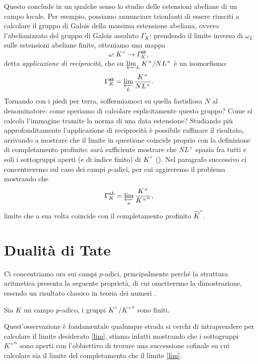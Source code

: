 Questo conclude in un qualche senso lo studio delle estensioni abeliane di un campo locale. Per esempio, possiamo annunciare trionfanti di essere riusciti a calcolare il gruppo di Galois della massima estensione abeliana, ovvero l'abelianizzato del gruppo di Galois assoluto $ \Gamma_K $: prendendo il limite inverso di $ \omega_L $ sulle estensioni abeliane finite, otteniamo una mappa
\[ \omega\colon K^\times \to \Gamma_K^{\texttt{ab}}, \]
detta \emph{applicazione di reciprocità}, che su $ \varprojlim_L K^\times / NL^\times  $ è un isomorfismo:
\begin{equation}\label{lim}
	\Gamma_K^{\texttt{ab}} = \varprojlim_L \frac{K^\times}{NL^\times}.
\end{equation}
Tornando con i piedi per terra, soffermiamoci su quella fastidiosa $ N $ al denominatore: come speriamo di calcolare esplicitamente questo gruppo? Come si calcola l'immagine tramite la norma di una data estensione? Studiando più approfonditamente l'applicazione di reciprocità è possibile raffinare il risultato, arrivando a mostrare che il limite in questione coincide proprio con la definizione di completamento profinito: sarà sufficiente mostrare che $ NL^\times $ spazia fra tutti e soli i sottogruppi aperti (e di indice finito) di $ K^\times $ (\cite[XIV.\S 6.1]{SerreFields}). Nel paragrafo successivo ci concentreremo sul caso dei campi $ p $-adici, per cui aggireremo il problema mostrando che
\[ \Gamma^\text{ab}_K = \varprojlim_n \frac{K^\times}{{K^\times}^n}, \]
limite che a sua volta coincide con il completamento profinito $ \hat{K}^\times $.

\section{Dualità di Tate}
Ci concentriamo ora sui campi $ p $-adici, principalmente perché la struttura aritmetica presenta la seguente proprietà, di cui ometteremo la dimostrazione, essendo un risultato classico in teoria dei numeri \cite[proposizione 4.11]{Harari}.

\begin{proposition}
	Sia $ K $ un campo $ p $-adico, i gruppi $ K^\times / {K^\times}^n $ sono finiti.
\end{proposition}

Quest'osservazione è fondamentale qualunque strada si cerchi di intraprendere per calcolare il limite desiderato \eqref{lim}, stiamo infatti mostrando che i sottogruppi $ {K^\times}^n $ sono aperti con l'obbiettivo di trovare una successione cofinale su cui calcolare sia il limite del completamento che il limite \eqref{lim}.


